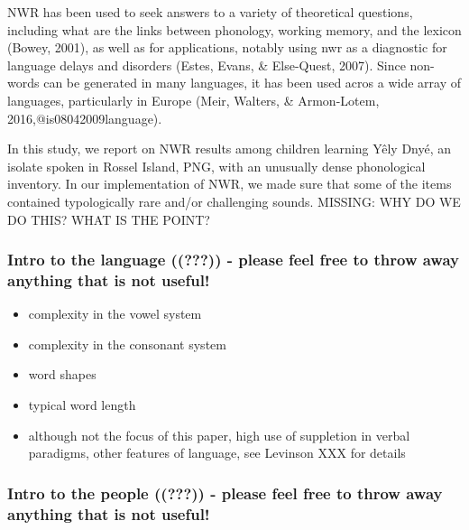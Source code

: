 \documentclass[english,,man]{apa6}
\providecommand{\tightlist}{%
  \setlength{\itemsep}{0pt}\setlength{\parskip}{0pt}}
\begin{document}
NWR has been used to seek answers to a variety of theoretical questions, including what are the links between phonology, working memory, and the lexicon (Bowey, 2001), as well as for applications, notably using nwr as a diagnostic for language delays and disorders (Estes, Evans, \& Else-Quest, 2007). Since non-words can be generated in many languages, it has been used acros a wide array of languages, particularly in Europe (Meir, Walters, \& Armon-Lotem, 2016,@is08042009language).

In this study, we report on NWR results among children learning Yêly Dnyé, an isolate spoken in Rossel Island, PNG, with an unusually dense phonological inventory. In our implementation of NWR, we made sure that some of the items contained typologically rare and/or challenging sounds. MISSING: WHY DO WE DO THIS? WHAT IS THE POINT?

\hypertarget{intro-to-the-language-mc---please-feel-free-to-throw-away-anything-that-is-not-useful}{%
\subsubsection{\texorpdfstring{Intro to the language (({\textbf{???}})) - please feel free to throw away anything that is not useful!}{Intro to the language ((???)) - please feel free to throw away anything that is not useful!}}\label{intro-to-the-language-mc---please-feel-free-to-throw-away-anything-that-is-not-useful}}

\begin{itemize}
\tightlist
\item
  complexity in the vowel system
\item
  complexity in the consonant system
\item
  word shapes
\item
  typical word length
\item
  although not the focus of this paper, high use of suppletion in verbal paradigms, other features of language, see Levinson XXX for details
\end{itemize}

\hypertarget{intro-to-the-people-mc---please-feel-free-to-throw-away-anything-that-is-not-useful}{%
\subsubsection{\texorpdfstring{Intro to the people (({\textbf{???}})) - please feel free to throw away anything that is not useful!}{Intro to the people ((???)) - please feel free to throw away anything that is not useful!}}\label{intro-to-the-people-mc---please-feel-free-to-throw-away-anything-that-is-not-useful}}
\end{document}
